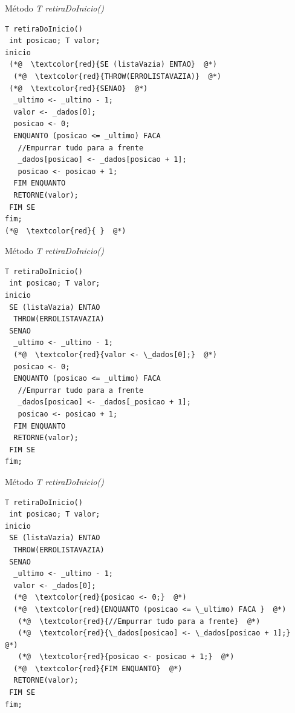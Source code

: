 \documentclass[12pt,table,xcolor={dvipsnames}]{beamer}
\begin{document}
\begin{frame}[fragile]{Método \textit{T retiraDoInicio()}}
\begin{lstlisting}
T retiraDoInicio()
 int posicao; T valor;
inicio
 (*@  \textcolor{red}{SE (listaVazia) ENTAO}  @*)
  (*@  \textcolor{red}{THROW(ERROLISTAVAZIA)}  @*)
 (*@  \textcolor{red}{SENAO}  @*)
  _ultimo <- _ultimo - 1;
  valor <- _dados[0];
  posicao <- 0;
  ENQUANTO (posicao <= _ultimo) FACA
   //Empurrar tudo para a frente
   _dados[posicao] <- _dados[posicao + 1];
   posicao <- posicao + 1;
  FIM ENQUANTO
  RETORNE(valor);
 FIM SE
fim;
(*@  \textcolor{red}{ }  @*)
\end{lstlisting}
\end{frame}

\begin{frame}[fragile]{Método \textit{T retiraDoInicio()}}
\begin{lstlisting}
T retiraDoInicio()
 int posicao; T valor;
inicio
 SE (listaVazia) ENTAO
  THROW(ERROLISTAVAZIA)
 SENAO
  _ultimo <- _ultimo - 1;
  (*@  \textcolor{red}{valor <- \_dados[0];}  @*)
  posicao <- 0;
  ENQUANTO (posicao <= _ultimo) FACA
   //Empurrar tudo para a frente
   _dados[posicao] <- _dados[_posicao + 1];
   posicao <- posicao + 1;
  FIM ENQUANTO
  RETORNE(valor);
 FIM SE
fim;

\end{lstlisting}
\end{frame}

\begin{frame}[fragile]{Método \textit{T retiraDoInicio()}}
\begin{lstlisting}
T retiraDoInicio()
 int posicao; T valor;
inicio
 SE (listaVazia) ENTAO
  THROW(ERROLISTAVAZIA)
 SENAO
  _ultimo <- _ultimo - 1;
  valor <- _dados[0];
  (*@  \textcolor{red}{posicao <- 0;}  @*)
  (*@  \textcolor{red}{ENQUANTO (posicao <= \_ultimo) FACA }  @*)
   (*@  \textcolor{red}{//Empurrar tudo para a frente}  @*)
   (*@  \textcolor{red}{\_dados[posicao] <- \_dados[posicao + 1];}  @*)
   (*@  \textcolor{red}{posicao <- posicao + 1;}  @*)
  (*@  \textcolor{red}{FIM ENQUANTO}  @*)
  RETORNE(valor);
 FIM SE
fim;

\end{lstlisting}
\end{frame}
\end{document}
